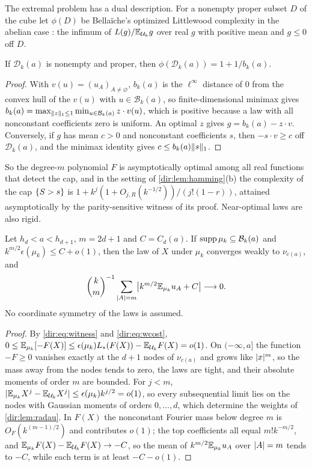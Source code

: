The extremal problem has a dual description. For a nonempty proper subset $D$ of the cube let
$\phi(D)$ be Bella\"iche's optimized Littlewood complexity in the abelian case
\cite{Bellaiche2016Chebotarev}: the infimum of $L(g)/\mathbb{E}_{\mathcal U_k}g$ over real $g$ with
positive mean and $g\le0$ off $D$.

\begin{proposition}\label{dir:prop:hammingdual}
If $\mathcal D_k(a)$ is nonempty and proper, then $\phi(\mathcal D_k(a))=1+1/b_k(a)$.
\end{proposition}

\begin{proof}
With $v(u)=(u_A)_{A\ne\varnothing}$, $b_k(a)$ is the $\ell^\infty$ distance of $0$ from the convex
hull of the $v(u)$ with $u\in\mathcal B_k(a)$, so finite-dimensional minimax gives
$b_k(a)=\max_{\lVert z\rVert_1\le1}\min_{u\in\mathcal B_k(a)}z\cdot v(u)$, which is positive because a law
with all nonconstant coefficients zero is uniform. An optimal $z$ gives $g=b_k(a)-z\cdot v$.
Conversely, if $g$ has mean $c>0$ and nonconstant coefficients $s$, then $-s\cdot v\ge c$ off
$\mathcal D_k(a)$, and the minimax identity gives $c\le b_k(a)\lVert s\rVert_1$.
\end{proof}

So the degree-$m$ polynomial $F$ is asymptotically optimal among all real functions that detect
the cap, and in the setting of \cref{dir:lem:hamming}(b) the complexity of the cap $\{S>s\}$ is
$1+k^j(1+O_{j,R}(k^{-1/2}))/(j!(1-r))$, attained asymptotically by the parity-sensitive witness of its
proof. Near-optimal laws are also rigid.

\begin{proposition}\label{dir:prop:hammingrigid}
Let $h_d<a<h_{d+1}$, $m=2d+1$ and $C=C_d(a)$. If $\operatorname{supp}\mu_k\subseteq\mathcal B_k(a)$ and
$k^{m/2}\epsilon(\mu_k)\le C+o(1)$, then the law of $X$ under $\mu_k$ converges weakly to
$\nu_{c(a)}$, and
\[
 \binom km^{-1}\sum_{\lvert A\rvert=m}\bigl|k^{m/2}\mathbb{E}_{\mu_k}u_A+C\bigr|\longrightarrow0 .
\]
No coordinate symmetry of the laws is assumed.
\end{proposition}

\begin{proof}
By \eqref{dir:eq:witness} and \eqref{dir:eq:wcost},
$0\le\mathbb{E}_{\mu_k}[-F(X)]\le\epsilon(\mu_k)L_*(F(X))-\mathbb{E}_{\mathcal U_k}F(X)=o(1)$. On $(-\infty,a]$
the function $-F\ge0$ vanishes exactly at the $d+1$ nodes of $\nu_{c(a)}$ and grows like
$\lvert x\rvert^m$, so the mass away from the nodes tends to zero, the laws are tight, and their absolute
moments of order $m$ are bounded. For $j<m$,
$\lvert\mathbb{E}_{\mu_k}X^j-\mathbb{E}_{\mathcal U_k}X^j\rvert\le\epsilon(\mu_k)k^{j/2}=o(1)$, so every subsequential
limit lies on the nodes with Gaussian moments of orders $0,\dots,d$, which determine the weights
of \cref{dir:lem:radau}. In $F(X)$ the nonconstant Fourier mass below degree $m$ is
$O_F(k^{(m-1)/2})$ and contributes $o(1)$; the top coefficients all equal $m!k^{-m/2}$, and
$\mathbb{E}_{\mu_k}F(X)-\mathbb{E}_{\mathcal U_k}F(X)\to-C$, so the mean of $k^{m/2}\mathbb{E}_{\mu_k}u_A$ over
$\lvert A\rvert=m$ tends to $-C$, while each term is at least $-C-o(1)$.
\end{proof}

